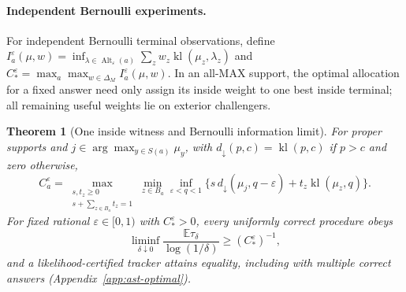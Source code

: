 \documentclass{article}
\theoremstyle{plain}
\newtheorem{theorem}{Theorem}[section]
\theoremstyle{definition}
\DeclareMathOperator{\kl}{kl}
\begin{document}
\paragraph{Independent Bernoulli experiments.}
For independent Bernoulli terminal observations, define $I_a^\varepsilon(\mu,w)=\inf_{\lambda\in\operatorname{Alt}_\varepsilon(a)}\sum_z w_z\kl(\mu_z,\lambda_z)$ and $C_*^\varepsilon=\max_a\max_{w\in\Delta_M} I_a^\varepsilon(\mu,w)$. In an all-MAX support, the optimal allocation for a fixed answer need only assign its inside weight to one best inside terminal; all remaining useful weights lie on exterior challengers.
\begin{theorem}[One inside witness and Bernoulli information limit]\label{thm:ast-main}
For proper supports and $j\in\arg\max_{y\in S(a)}\mu_y$, with $d_\downarrow(p,c)=\kl(p,c)$ if $p>c$ and zero otherwise,
\begin{equation}
 C_a^\varepsilon=\max_{\substack{s,t_z\ge0\\s+\sum_{z\in B_a}t_z=1}}\min_{z\in B_a}\inf_{\varepsilon<q<1}\{s\,d_\downarrow(\mu_j,q-\varepsilon)+t_z\kl(\mu_z,q)\}.
 \label{eq:ast-star}
\end{equation}
For fixed rational $\varepsilon\in[0,1)$ with $C_*^\varepsilon>0$, every uniformly correct procedure obeys
\begin{equation}
 \liminf_{\delta\downarrow0}\frac{\mathbb E\tau_\delta}{\log(1/\delta)}\ge (C_*^\varepsilon)^{-1},
 \label{eq:ast-lower-main}
\end{equation}
and a likelihood-certified tracker attains equality, including with multiple correct answers (Appendix~\ref{app:ast-optimal}).
\end{theorem}
\end{document}
